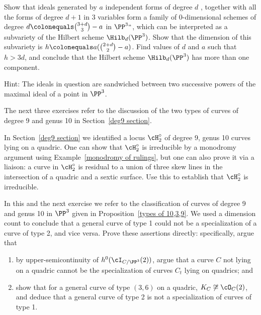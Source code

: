 \begin{exercise}[Iarrobino]\label{bigger component}
Show that ideals generated by $a$ independent forms of degree $d$
,
together with all the forms of degree $d+1$ in 3 variables
form a family of 0-dimensional schemes of degree $d\colonequals
\tbinom{3+d}{3} -a$
in $\PP^3` `$, which can be interpreted as a subvariety
of the Hilbert scheme $\Hilb_d(\PP^3)$. Show that the dimension of this
subvariety is $h \colonequals  a(\tbinom{2+d}{ 2}-a)$. Find values of
$d$ and $a$ such that $h>3d$, and conclude that the Hilbert scheme
$\Hilb_d(\PP^3)$ has more than one component.

Hint: The ideals in question are sandwiched between two successive powers
of the maximal ideal of a point in $\PP^3$.
\end{exercise}

The next three exercises refer to the discussion of the two types of
curves of degree 9 and genus 10 in Section~\ref{deg9 section}.

\begin{exercise}\label{degree 9 type 2 is irreducible}
In Section~\ref{deg9 section} we identified a locus $\cH^\circ_2$ of
degree 9, genus 10 curves lying on a quadric.
One can show that $\cH^\circ_2$  is irreducible by a monodromy argument
using Example~\ref{monodromy of rulings}, but one can also prove it via
a liaison:  a curve in $\cH^\circ_2$ is residual to a union of three
skew lines in the intersection of a quadric and a sextic surface. Use
this to establish that $\cH^\circ_2$ is irreducible.
\end{exercise}

\begin{exercise}
 In this and the next exercise we refer to the classification of curves
 of degree 9 and genus 10 in $\PP^3$ given in Proposition~\ref{types
 of 10,3,9}. We used a dimension count to conclude that a general curve
 of type 1 could not be a specialization of a curve of type 2, and vice
 versa. Prove these assertions directly: specifically, argue that
\begin{enumerate}
\item by upper-semicontinuity of $h^0(\cI_{C/\PP^3}(2))$, argue that a
curve $C$ not lying on a quadric cannot be the specialization of curves
$C_t$ lying on quadrics; and
\item show that for a general curve of type $(3,6)$ on a quadric, $K_C
\not\cong \cO_C(2)$, and deduce that a general curve of type 2 is not
a specialization of curves of type 1.
\end{enumerate}
\end{exercise}

